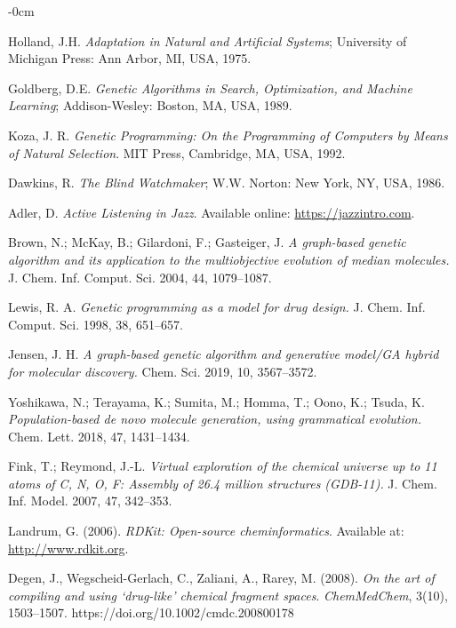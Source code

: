 \documentclass[life,article,submit,pdftex,moreauthors]{Definitions/mdpi}
\begin{document}
\begin{adjustwidth}{-\extralength}{0cm}
{\begin{thebibliography}{999}
Holland, J.H. \textit{Adaptation in Natural and Artificial Systems}; University of Michigan Press: Ann Arbor, MI, USA, 1975.

Goldberg, D.E. \textit{Genetic Algorithms in Search, Optimization, and Machine Learning}; Addison-Wesley: Boston, MA, USA, 1989.

Koza, J. R.
\textit{Genetic Programming: On the Programming of Computers by Means of Natural Selection}.
MIT Press, Cambridge, MA, USA, 1992.

Dawkins, R. \textit{The Blind Watchmaker}; W.W. Norton: New York, NY, USA, 1986.

Adler, D. \textit{Active Listening in Jazz}. Available online: \url{https://jazzintro.com}.

Brown, N.; McKay, B.; Gilardoni, F.; Gasteiger, J.
\textit{A graph-based genetic algorithm and its application to the multiobjective
evolution of median molecules.}
J. Chem. Inf. Comput. Sci. 2004, 44, 1079--1087.

Lewis, R. A.
\textit{Genetic programming as a model for drug design.}
J. Chem. Inf. Comput. Sci. 1998, 38, 651--657.

Jensen, J. H.
\textit{A graph-based genetic algorithm and generative model/GA hybrid for molecular discovery.}
Chem. Sci. 2019, 10, 3567--3572.

Yoshikawa, N.; Terayama, K.; Sumita, M.; Homma, T.; Oono, K.; Tsuda, K.
\textit{Population-based de novo molecule generation, using grammatical evolution.}
Chem. Lett. 2018, 47, 1431--1434.

Fink, T.; Reymond, J.-L.
\textit{Virtual exploration of the chemical universe up to 11 atoms of C, N, O, F:
Assembly of 26.4 million structures (GDB-11).}
J. Chem. Inf. Model. 2007, 47, 342--353.

Landrum, G. (2006). \textit{RDKit: Open-source cheminformatics}. Available at: \url{http://www.rdkit.org}.

Degen, J., Wegscheid-Gerlach, C., Zaliani, A., Rarey, M. (2008).
\textit{On the art of compiling and using ‘drug-like’ chemical fragment spaces}.
\textit{ChemMedChem}, 3(10), 1503–1507. https://doi.org/10.1002/cmdc.200800178


\end{thebibliography}}
\end{adjustwidth}
\end{document}
